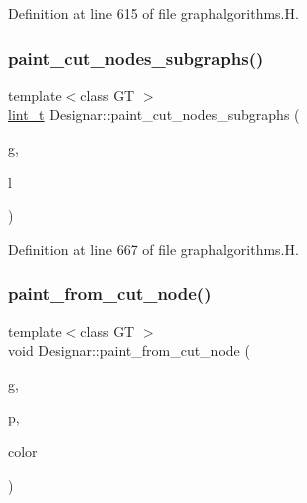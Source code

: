 Definition at line 615 of file graphalgorithms.\+H.

\mbox{\label{namespace_designar_a4a53202e6320a9435f829867671c26c1}} 
\subsubsection{\texorpdfstring{paint\+\_\+cut\+\_\+nodes\+\_\+subgraphs()}{paint\_cut\_nodes\_subgraphs()}}
{\footnotesize\ttfamily template$<$class GT $>$ \\
\hyperlink{namespace_designar_a9d113d66a39e82b73727c72cd3a52f73}{lint\+\_\+t} Designar\+::paint\+\_\+cut\+\_\+nodes\+\_\+subgraphs (\begin{DoxyParamCaption}\item[{\hyperlink{demo-buildgraph_8_c_a3001c40d2c31ca87ed96cd7d1334a55e}{GT} \&}]{g,  }\item[{const \hyperlink{class_designar_1_1_s_l_list}{S\+L\+List}$<$ \hyperlink{namespace_designar_a5af326c65aa2bd26b26c410f2030d09e}{Node}$<$ \hyperlink{demo-buildgraph_8_c_a3001c40d2c31ca87ed96cd7d1334a55e}{GT} $>$ $\ast$$>$ \&}]{l }\end{DoxyParamCaption})}



Definition at line 667 of file graphalgorithms.\+H.

\mbox{\label{namespace_designar_a0b57b399593e711bef1c99a4c41c238a}} 
\subsubsection{\texorpdfstring{paint\+\_\+from\+\_\+cut\+\_\+node()}{paint\_from\_cut\_node()}}
{\footnotesize\ttfamily template$<$class GT $>$ \\
void Designar\+::paint\+\_\+from\+\_\+cut\+\_\+node (\begin{DoxyParamCaption}\item[{\hyperlink{demo-buildgraph_8_c_a3001c40d2c31ca87ed96cd7d1334a55e}{GT} \&}]{g,  }\item[{\hyperlink{namespace_designar_a5af326c65aa2bd26b26c410f2030d09e}{Node}$<$ \hyperlink{demo-buildgraph_8_c_a3001c40d2c31ca87ed96cd7d1334a55e}{GT} $>$ \&}]{p,  }\item[{\hyperlink{namespace_designar_a9d113d66a39e82b73727c72cd3a52f73}{lint\+\_\+t} \&}]{color }\end{DoxyParamCaption})}



